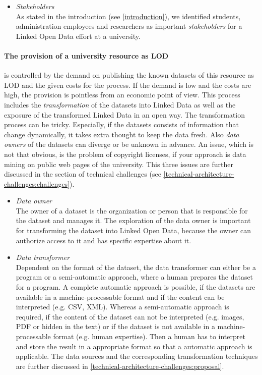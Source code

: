 \documentclass{article}
\begin{document}
\begin{itemize}
\item \textit{Stakeholders}~\\
As stated in the introduction (see \ref{introduction}), we identified students, administration employees and researchers as important \textit{stakeholders} for a Linked Open Data effort at a university.

\end{itemize}

\paragraph{The provision of a university resource as LOD}
\label{technical-architecture-challenges:lod-effort:provision-resources}
is controlled by the demand on publishing the known datasets of this resource as LOD and the given costs for the process. If the demand is low and the costs are high, the provision is pointless from an economic point of view. This process includes the \textit{transformation} of the datasets into Linked Data as well as the exposure of the transformed Linked Data in an open way. The transformation process can be tricky. Especially, if the datasets consists of information that change dynamically, it takes extra thought to keep the data fresh. Also \textit{data owners} of the datasets can diverge or be unknown in advance. An issue, which is not that obvious, is the problem of copyright licenses, if your approach is data mining on public web pages of the university. This three issues are further discussed in the section of technical challenges (see \ref{technical-architecture-challenges:challenges}).

\begin{itemize}
\item \textit{Data owner}~\\
The owner of a dataset is the organization or person that is responsible for the dataset and manages it. The exploration of the data owner is important for transforming the dataset into Linked Open Data, because the owner can authorize access to it and has specific expertise about it. 

\item \textit{Data transformer}~\\
Dependent on the format of the dataset, the data transformer can either be a program or a semi-automatic approach, where a human prepares the dataset for a program. A complete automatic approach is possible, if the datasets are available in a machine-processable format and if the content can be interpreted (e.g. CSV, XML). Whereas a semi-automatic approach is required, if the content of the dataset can not be interpreted (e.g. images, PDF or hidden in the text) or if the dataset is not available in a machine-processable format (e.g. human expertise). Then a human has to interpret and store the result in a appropriate format so that a automatic approach is applicable. The data sources and the corresponding transformation techniques are further discussed in \ref{technical-architecture-challenges:proposal}.

\end{itemize}
\end{document}
